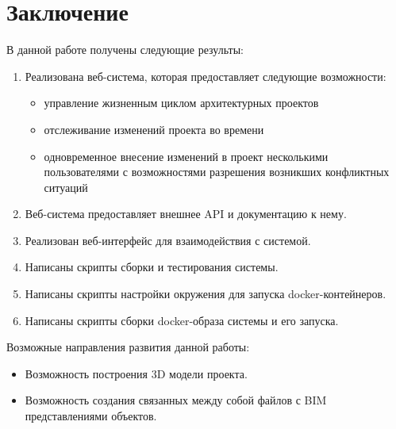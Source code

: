 \documentclass[a4paper,14pt]{extreport} %
\begin{document}
\newpage
\chapter{Заключение}

В данной работе получены следующие результы:
\begin{enumerate}
\item Реализована  веб-система, которая предоставляет следующие возможности:
\begin{itemize}
\item управление жизненным циклом архитектурных проектов
\item отслеживание изменений проекта во времени
\item одновременное внесение изменений в проект несколькими пользователями с возможностями разрешения возникших конфликтных ситуаций
\end{itemize}
\item Веб-система предоставляет внешнее API и документацию к нему.
\item Реализован веб-интерфейс для взаимодействия с системой.
\item Написаны скрипты сборки и тестирования системы.
\item Написаны скрипты настройки окружения для запуска docker-контейнеров.
\item Написаны скрипты сборки docker-образа системы и его запуска.
\end{enumerate}

Возможные направления развития данной работы:
\begin{itemize}
\item Возможность построения 3D модели проекта.
\item Возможность создания связанных между собой файлов с BIM представлениями объектов.
\end{itemize}
\end{document}
